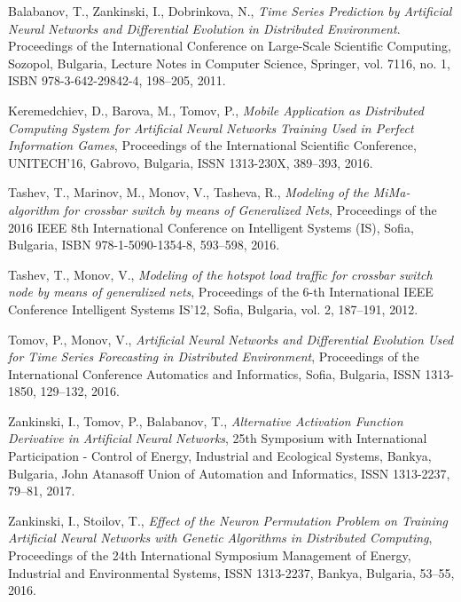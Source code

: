 \documentclass{llncs}
\begin{document}
\begin{thebibliography}{99}
 Balabanov, T., Zankinski, I., Dobrinkova, N., \textit{Time Series Prediction by Artificial Neural Networks and Differential Evolution in Distributed Environment}. Proceedings of the International Conference on Large-Scale Scientific Computing, Sozopol, Bulgaria, Lecture Notes in Computer Science, Springer, vol. 7116, no. 1, ISBN 978-3-642-29842-4, 198–205, 2011. 

 Keremedchiev, D., Barova, M., Tomov, P., \textit{Mobile Application as Distributed Computing System for Artificial Neural Networks Training Used in Perfect Information Games}, Proceedings of the International Scientific Conference, UNITECH’16, Gabrovo, Bulgaria, ISSN 1313-230X, 389--393, 2016.

 Tashev, T., Marinov, M., Monov, V., Tasheva, R., \textit{Modeling of the MiMa-algorithm for crossbar switch by means of Generalized Nets}, Proceedings of the 2016 IEEE 8th International Conference on Intelligent Systems (IS), Sofia, Bulgaria, ISBN 978-1-5090-1354-8, 593--598, 2016.

 Tashev, T., Monov, V., \textit{Modeling of the hotspot load traffic for crossbar switch node by means of generalized nets}, Proceedings of the 6-th International IEEE Conference Intelligent Systems IS'12, Sofia, Bulgaria, vol. 2, 187--191, 2012.

 Tomov, P., Monov, V., \textit{Artificial Neural Networks and Differential Evolution Used for Time Series Forecasting in Distributed Environment}, Proceedings of the International Conference Automatics and Informatics, Sofia, Bulgaria, ISSN 1313-1850, 129--132, 2016.

 Zankinski, I., Tomov, P., Balabanov, T., \textit{Alternative Activation Function Derivative in Artificial Neural Networks}, 25th Symposium with International Participation - Control of Energy, Industrial and Ecological Systems, Bankya, Bulgaria, John Atanasoff Union of Automation and Informatics, ISSN 1313-2237, 79--81, 2017.

 Zankinski, I., Stoilov, T., \textit{Effect of the Neuron Permutation Problem on Training Artificial Neural Networks with Genetic Algorithms in Distributed Computing}, Proceedings of the 24th International Symposium Management of Energy, Industrial and Environmental Systems, ISSN 1313-2237, Bankya, Bulgaria, 53--55, 2016.

\end{thebibliography}
\end{document}
